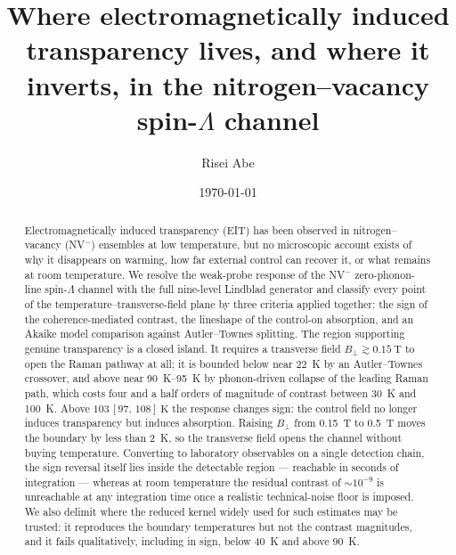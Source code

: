 \documentclass[
  reprint,
  amsmath,amssymb,
  aps,pra,
  superscriptaddress,
  floatfix,
]{revtex4-2}
\newcommand{\Bperp}{B_{\perp}}
\begin{document}
\title{Where electromagnetically induced transparency lives, and where it
inverts, in the nitrogen--vacancy spin-$\Lambda$ channel}

\author{Risei Abe}

\date{\today}

\begin{abstract}
Electromagnetically induced transparency (EIT) has been observed in
nitrogen--vacancy (NV$^{-}$) ensembles at low temperature, but no microscopic
account exists of why it disappears on warming, how far external control can
recover it, or what remains at room temperature. We resolve the weak-probe
response of the NV$^{-}$ zero-phonon-line spin-$\Lambda$ channel with the full
nine-level Lindblad generator and classify every point of the
temperature--transverse-field plane by three criteria applied together: the
sign of the coherence-mediated contrast, the lineshape of the control-on
absorption, and an Akaike model comparison against Autler--Townes splitting.
The region supporting genuine transparency is a closed island. It requires a
transverse field $\Bperp \gtrsim \SI{0.15}{\tesla}$ to open the Raman pathway
at all; it is bounded below near \SI{22}{\kelvin} by an Autler--Townes
crossover, and above near \SI{90}{\kelvin}--\SI{95}{\kelvin} by phonon-driven
collapse of the leading Raman path, which costs four and a half orders of
magnitude of contrast between \SI{30}{\kelvin} and \SI{100}{\kelvin}. Above
$103\,[97,\,108]~\si{\kelvin}$ the response changes sign: the control field no
longer induces transparency but induces absorption. Raising $\Bperp$ from
\SI{0.15}{\tesla} to \SI{0.5}{\tesla} moves the boundary by less than
\SI{2}{\kelvin}, so the transverse field opens the channel without buying
temperature. Converting to laboratory observables on a single detection chain,
the sign reversal itself lies inside the detectable region --- reachable in
seconds of integration --- whereas at room temperature the residual contrast
of $\sim\!10^{-9}$ is unreachable at any integration time once a realistic
technical-noise floor is imposed. We also delimit where the reduced
kernel widely used for such estimates may be trusted: it reproduces the
boundary temperatures but not the contrast magnitudes, and it fails
qualitatively, including in sign, below \SI{40}{\kelvin} and above
\SI{90}{\kelvin}.
\end{abstract}

\maketitle
\end{document}

